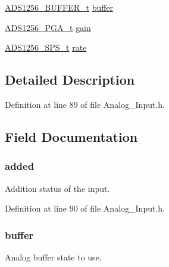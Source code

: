 \begin{DoxyCompactItemize}
\item 
\hyperlink{group__ads1256__driver_ga12f71f8fc93fe63fb3c855ddd2070890}{A\-D\-S1256\-\_\-\-B\-U\-F\-F\-E\-R\-\_\-t} \hyperlink{struct_analog___input__t_ac2c90c98d6a3c3e9dcd1d462078add38}{buffer}
\item 
\hyperlink{group__ads1256__driver_gace2e231df7cd3598eb26d5ff51171701}{A\-D\-S1256\-\_\-\-P\-G\-A\-\_\-t} \hyperlink{struct_analog___input__t_a9eb75430d096aa3e9c2211f836ae0b88}{gain}
\item 
\hyperlink{group__ads1256__driver_gab0437f81aad031aadf3e05dd5fe0a731}{A\-D\-S1256\-\_\-\-S\-P\-S\-\_\-t} \hyperlink{struct_analog___input__t_a8b7d6ee501678613c98e13a2dfbf33b5}{rate}
\end{DoxyCompactItemize}


\subsection{Detailed Description}


Definition at line 89 of file Analog\-\_\-\-Input.\-h.



\subsection{Field Documentation}
\hypertarget{struct_analog___input__t_a6f1a4402ff8651dfc5e453b5e3154c2d}{
\subsubsection[{added}]{ added}}\label{struct_analog___input__t_a6f1a4402ff8651dfc5e453b5e3154c2d}
Addition status of the input. 

Definition at line 90 of file Analog\-\_\-\-Input.\-h.

\hypertarget{struct_analog___input__t_ac2c90c98d6a3c3e9dcd1d462078add38}{
\subsubsection[{buffer}]{ buffer}}\label{struct_analog___input__t_ac2c90c98d6a3c3e9dcd1d462078add38}
Analog buffer state to use. 

